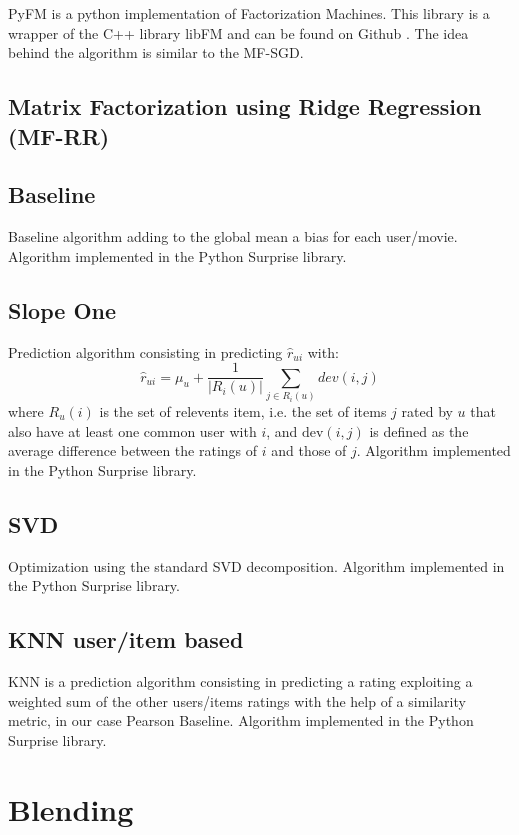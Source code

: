 \documentclass[10pt,conference,compsocconf]{IEEEtran}
\begin{document}
PyFM is a python implementation of Factorization Machines. This library is a wrapper of the C++ library libFM \cite{rendle:tist2012} and can be found on Github \cite{pyfm}. The idea behind the algorithm is similar to the MF-SGD. 

\subsection{Matrix Factorization using Ridge Regression (MF-RR)}

\subsection{Baseline}
Baseline algorithm adding to the global mean a bias for each user/movie. Algorithm implemented in the
Python Surprise library. \cite{library:surprise}


\subsection{Slope One}
Prediction algorithm consisting in predicting $\hat r_{ui}$ with:
$$ \hat r_{ui}=\mu_u + \frac{1}{|R_i(u)|}\sum_{j\in R_i(u)} dev(i,j)$$
where $R_u(i)$ is the set of relevents item, i.e. the set of items $j$ rated by $u$ that also have
at least one common user with $i$, and $\text{dev}(i,j)$ is defined as the average difference
between the ratings of $i$ and those of $j$. Algorithm implemented in the Python Surprise library.
\cite{library:surprise} \cite{lemire2005slope}

\subsection{SVD}
Optimization using the standard SVD decomposition. Algorithm implemented in the Python Surprise library. \cite{library:surprise}

\subsection{KNN user/item based}
KNN is a prediction algorithm consisting in predicting a rating exploiting a weighted sum 
of the other users/items ratings with the help of a similarity metric, in our case Pearson Baseline. Algorithm implemented in the Python Surprise library. \cite{library:surprise}


\section{Blending}
\label{sec:blending}
\end{document}
